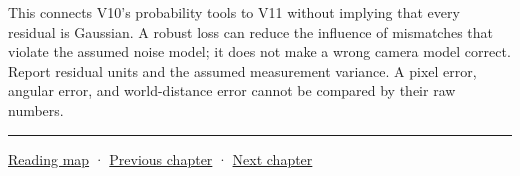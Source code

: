This connects V10's probability tools to V11 without implying that every residual is Gaussian. A robust loss can reduce the influence of mismatches that violate the assumed noise model; it does not make a wrong camera model correct. Report residual units and the assumed measurement variance. A pixel error, angular error, and world-distance error cannot be compared by their raw numbers.

\begin{center}\rule{0.5\linewidth}{0.5pt}\end{center}

\hyperref[volume-reading-map]{Reading map} · \hyperref[02-foundations-ii-ch033]{Previous chapter} · \hyperref[02-foundations-ii-ch035]{Next chapter}

